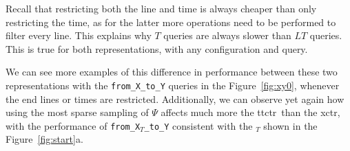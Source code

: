     Recall that restricting both the line and time is always cheaper than only restricting the time, as for the latter more operations need to be performed to filter every line. This explains why $T$ queries are always slower than $LT$ queries. This is true for both representations, with any configuration and query.
    
    We can see more examples of this difference in performance between these two representations with the \texttt{from\_X\_to\_Y} queries in the Figure~\ref{fig:xy0}, whenever the end lines or times are restricted. Additionally, we can observe yet again how using the most sparse sampling of $\Psi$ affects much more the \gls{ttctr}~than the \gls{xctr}, with the performance of \texttt{from\_X$_{T}$\_to\_Y} consistent with the \texttt{\startX$_T$} shown in the Figure~\ref{fig:start}a.
    
